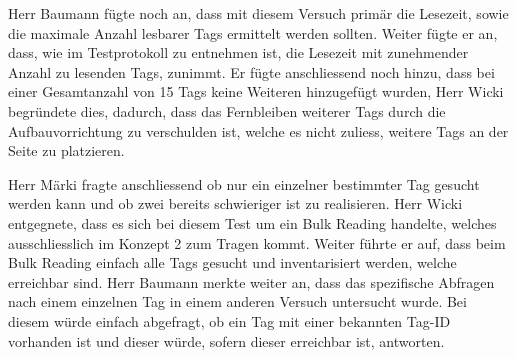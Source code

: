 \documentclass[parskip=full, a4paper]{scrreprt}
\begin{document}
Herr Baumann fügte noch an, dass mit diesem Versuch primär die Lesezeit, sowie die maximale Anzahl lesbarer Tags ermittelt werden sollten. Weiter fügte er an, dass, wie im Testprotokoll zu entnehmen ist, die Lesezeit mit zunehmender Anzahl zu lesenden Tags, zunimmt. Er fügte anschliessend noch hinzu, dass bei einer Gesamtanzahl von 15 Tags keine Weiteren hinzugefügt wurden, Herr Wicki begründete dies, dadurch, dass das Fernbleiben weiterer Tags durch die Aufbauvorrichtung zu verschulden ist, welche es nicht zuliess, weitere Tags an der Seite zu platzieren.

Herr Märki fragte anschliessend ob nur ein einzelner bestimmter Tag gesucht werden kann und ob zwei bereits schwieriger ist zu realisieren. Herr Wicki entgegnete, dass es sich bei diesem Test um ein Bulk Reading handelte, welches ausschliesslich im Konzept 2 zum Tragen kommt. Weiter führte er auf, dass beim Bulk Reading einfach alle Tags gesucht und inventarisiert werden, welche erreichbar sind.
Herr Baumann merkte weiter an, dass das spezifische Abfragen nach einem einzelnen Tag in einem anderen Versuch untersucht wurde. Bei diesem würde einfach abgefragt, ob ein Tag mit einer bekannten Tag-ID vorhanden ist und dieser würde, sofern dieser erreichbar ist, antworten.
\end{document}
